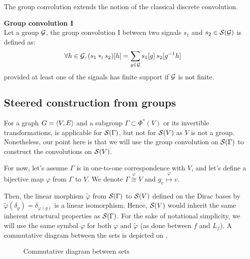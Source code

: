 The group convolution extends the notion of the classical discrete convolution.

\begin{definition}\textbf{Group convolution I}\\
Let a group $\mathcal{G}$, the group convolution I between two signals $s_1$ and $s_2 \in \mathcal{S}(\mathcal{G})$ is defined as:
\begin{align*}
\forall h \in \group, (s_1 \ast_{\I} s_2)[h] & = \displaystyle \sum_{g \in \group} s_1[g] \h{2} s_2[g^{-1}h]%
\end{align*}
provided at least one of the signals has finite support if $\mathcal{G}$ is not finite.
\label{def:conv1}
\end{definition}

\subsection{Steered construction from groups}

For a graph $G = \langle V, E \rangle$ and a subgroup $\Gamma \subset \Phi^*(V)$ or its invertible transformations,  is applicable for $\mathcal{S}(\Gamma)$, but not for $\mathcal{S}(V)$ as $V$ is not a group. Nonetheless, our point here is that we will use the group convolution on $\mathcal{S}(\Gamma)$ to construct the convolutions on $\mathcal{S}(V)$.

For now, let's assume $\Gamma$ is in one-to-one correspondence with $V$, and let's define a bijective map $\varphi$ from $\Gamma$ to $V$. We denote $\Gamma \overset{\varphi}{\cong} V$ and $g_v \overset{\varphi}\mapsto v$.

Then, the linear morphism $\widetilde\varphi$ from $\mathcal{S}(\Gamma)$ to $\mathcal{S}(V)$ defined on the Dirac bases by $\widetilde\varphi(\delta_g) = \delta_{\varphi(g)}$ is a linear isomorphism. Hence, $\mathcal{S}(V)$ would inherit the same inherent structural properties as $\mathcal{S}(\Gamma)$. For the sake of notational simplicity, we will use the same symbol $\varphi$ for both $\varphi$ and $\widetilde\varphi$ (as done between $f$ and $L_f$). A commutative diagram between the sets is depicted on .

\begin{figure}[H]
\centering
{}%
\caption{Commutative diagram between sets}
\label{fig:iso}
\end{figure}

